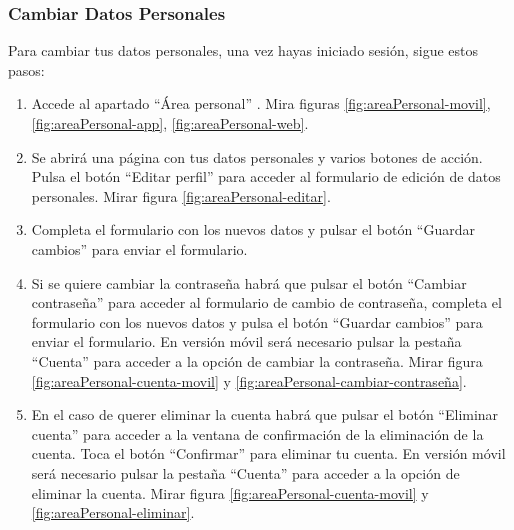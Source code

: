 \subsubsection{Cambiar Datos Personales}
Para cambiar tus datos personales, una vez hayas iniciado sesión, sigue estos pasos:
\begin{enumerate}
	\item Accede al apartado “Área personal” . Mira figuras \ref{fig:areaPersonal-movil}, \ref{fig:areaPersonal-app}, \ref{fig:areaPersonal-web}.

	\item Se abrirá una página con tus datos personales y varios botones de acción. Pulsa el botón “Editar perfil” para acceder al formulario de edición de datos personales.
	      Mirar figura \ref{fig:areaPersonal-editar}.
	\item Completa el formulario con los nuevos datos y pulsar el botón “Guardar cambios” para enviar el formulario.
	\item Si se quiere cambiar la contraseña habrá que pulsar el botón “Cambiar contraseña” para acceder al formulario de cambio de contraseña, completa el formulario con los nuevos datos y pulsa el botón “Guardar cambios” para enviar el formulario.
	      En versión móvil será necesario pulsar la pestaña “Cuenta” para acceder a la opción de cambiar la contraseña. Mirar figura \ref{fig:areaPersonal-cuenta-movil} y \ref{fig:areaPersonal-cambiar-contraseña}.
	\item En el caso de querer eliminar la cuenta habrá que pulsar el botón “Eliminar cuenta” para acceder a la ventana de confirmación de la eliminación de la cuenta. Toca el botón “Confirmar” para eliminar tu cuenta.
	      En versión móvil será necesario pulsar la pestaña “Cuenta” para acceder a la opción de eliminar la cuenta. Mirar figura \ref{fig:areaPersonal-cuenta-movil} y \ref{fig:areaPersonal-eliminar}.
\end{enumerate}


